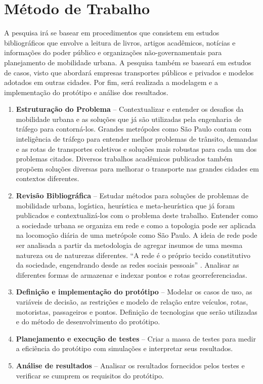 \section{Método de Trabalho}\label{metodo-trabalho}
A pesquisa irá se basear em procedimentos que consistem em estudos bibliográficos que envolve a leitura de livros, artigos acadêmicos, notícias e informações do poder público e organizações não-governamentais para planejamento de mobilidade urbana. A pesquisa também se baseará em estudos de casos, visto que abordará empresas transportes públicos e privados e modelos adotados em outras cidades. Por fim, será realizada a modelagem e a implementação do protótipo e análise dos resultados.

\begin{enumerate}
\item \textbf{Estruturação do Problema} --
Contextualizar e entender os desafios da mobilidade urbana e as soluções que já são utilizadas pela engenharia de tráfego para contorná-los. Grandes metrópoles como São Paulo contam com inteligência de tráfego para entender melhor problemas de trânsito, demandas e as rotas de transportes coletivos e soluções mais robustas para cada um dos problemas citados. Diversos trabalhos acadêmicos publicados também propõem soluções diversas para melhorar o transporte nas grandes cidades em contextos diferentes.


\item \textbf{Revisão Bibliográfica} --
Estudar métodos para soluções de problemas de mobilidade urbana, logística, heurística e meta-heurística que já foram publicados e contextualizá-los com o problema deste trabalho. Entender como a sociedade urbana se organiza em rede e como a topologia pode ser aplicada na locomoção diária de uma metrópole como São Paulo.  A ideia de rede pode ser analisada a partir da metodologia de agregar insumos de uma mesma natureza ou de naturezas diferentes. ``A rede é o próprio tecido constitutivo da sociedade, engendrando desde as redes sociais pessoais'' \cite{inojosa}. Analisar as diferentes formas de armazenar e indexar pontos e rotas georreferenciadas.

\item \textbf{Definição e implementação do protótipo} --
Modelar os casos de uso, as variáveis de decisão, as restrições e modelo de relação entre veículos, rotas, motoristas, passageiros e pontos. Definição de tecnologias que serão utilizadas e do método de desenvolvimento do protótipo.

\item \textbf{Planejamento e execução de testes} --
Criar a massa de testes para medir a eficiência do protótipo com simulações e interpretar seus resultados.

\item \textbf{Análise de resultados} -- 
Analisar os resultados fornecidos pelos testes e verificar se cumprem os requisitos do protótipo.
\end{enumerate}


